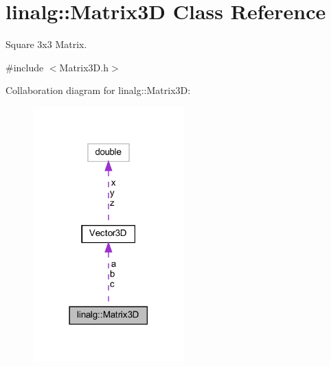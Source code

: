 \hypertarget{classlinalg_1_1Matrix3D}{}\section{linalg\+::Matrix3D Class Reference}
\label{classlinalg_1_1Matrix3D}


Square 3x3 Matrix.  




{\ttfamily \#include $<$Matrix3\+D.\+h$>$}



Collaboration diagram for linalg\+::Matrix3D\+:
\nopagebreak
\begin{figure}[H]
\begin{center}
\leavevmode
\includegraphics[width=165pt]{classlinalg_1_1Matrix3D__coll__graph}
\end{center}
\end{figure}
